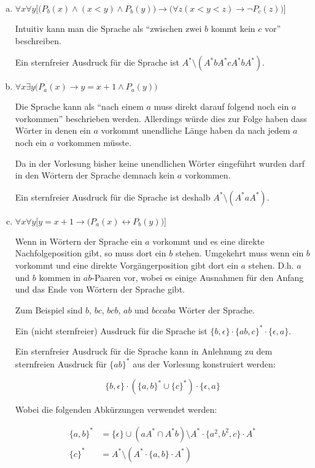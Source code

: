 \documentclass{scrartcl}
\begin{document}
\begin{enumerate}[(a)]
    \item $\forall x \forall y\Big[\big(P_b(x) \land (x < y) \land P_b(y)\big) \rightarrow \big(\forall z (x < y < z) \rightarrow \lnot P_c(z)\big)\Big]$

      Intuitiv kann man die Sprache als \enquote{zwischen zwei $b$ kommt kein $c$ vor} beschreiben.

      Ein sternfreier Ausdruck für die Sprache ist $A^* \setminus (A^* b A^* c A^* b A^*)$.

    \item $\forall x \exists y \Big( P_a(x) \rightarrow y = x+1 \land P_a(y)\Big)$

      Die Sprache kann als \enquote{nach einem $a$ muss direkt darauf folgend noch ein $a$ vorkommen} beschrieben werden. Allerdings würde dies zur Folge haben dass Wörter in denen ein $a$ vorkommt unendliche Länge haben da nach jedem $a$ noch ein $a$ vorkommen müsste.

      Da in der Vorlesung bisher keine unendlichen Wörter eingeführt wurden darf in den Wörtern der Sprache demnach kein $a$ vorkommen.

      Ein sternfreier Ausdruck für die Sprache ist deshalb $A^* \setminus (A^* a A^*)$.
    \item $\forall x \forall y \Big[ y = x+1 \rightarrow \big(P_a(x) \leftrightarrow P_b(y)\big)\Big]$

      Wenn in Wörtern der Sprache ein $a$ vorkommt und es eine direkte Nachfolgeposition gibt, so muss dort ein $b$ stehen. Umgekehrt muss wenn ein $b$ vorkommt und eine direkte Vorgängerposition gibt dort ein $a$ stehen. D.h. $a$ und $b$ kommen in $ab$-Paaren vor, wobei es einige Ausnahmen für den Anfang und das Ende von Wörtern der Sprache gibt.

      Zum Beispiel sind $b$, $bc$, $bcb$, $ab$ und $bccaba$ Wörter der Sprache.

      Ein (nicht sternfreier) Ausdruck für die Sprache ist $\{b, \epsilon\} \cdot \{ab,c\}^* \cdot \{\epsilon, a\}$.

      Ein sternfreier Ausdruck für die Sprache kann in Anlehnung zu dem sternfreien Ausdruck für $\{ab\}^*$ aus der Vorlesung konstruiert werden:

      \begin{equation*}
        \{b, \epsilon\} \cdot (\{a,b\}^* \cup \{c\}^*) \cdot \{\epsilon, a\}
      \end{equation*}

      Wobei die folgenden Abkürzungen verwendet werden:

      \begin{align*}
        \{a,b\}^* &= \{\epsilon\} \cup (aA^* \cap A^*b) \setminus A^* \cdot \{a^2, b^2, c\} \cdot A^*\\
        \{c\}^* &= A^* \setminus (A^* \cdot \{a, b\} \cdot A^*)
      \end{align*}
\end{enumerate}
\end{document}
